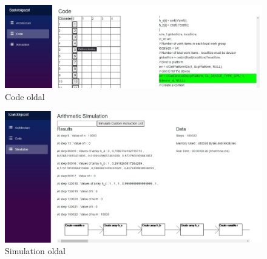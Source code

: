 \begin{figure}[h]
\centering
\includegraphics[scale=0.3]{images/Code.jpg}
\caption{Code oldal}
\label{fig:code}
\end{figure}

\begin{figure}[h]
\centering
\includegraphics[scale=0.4]{images/Simulation.jpg}
\caption{Simulation oldal}
\label{fig:sim}
\end{figure}